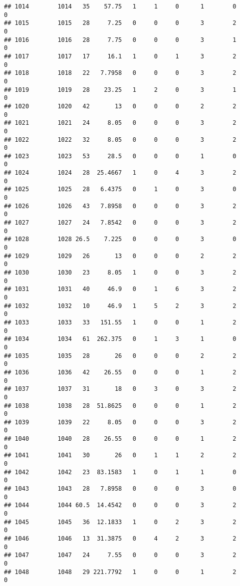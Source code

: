\documentclass[
]{article}
\begin{document}
\begin{verbatim}
## 1014        1014   35    57.75   1     1     0      1        0         0
## 1015        1015   28     7.25   0     0     0      3        2         0
## 1016        1016   28     7.75   0     0     0      3        1         0
## 1017        1017   17     16.1   1     0     1      3        2         0
## 1018        1018   22   7.7958   0     0     0      3        2         0
## 1019        1019   28    23.25   1     2     0      3        1         0
## 1020        1020   42       13   0     0     0      2        2         0
## 1021        1021   24     8.05   0     0     0      3        2         0
## 1022        1022   32     8.05   0     0     0      3        2         0
## 1023        1023   53     28.5   0     0     0      1        0         0
## 1024        1024   28  25.4667   1     0     4      3        2         0
## 1025        1025   28   6.4375   0     1     0      3        0         0
## 1026        1026   43   7.8958   0     0     0      3        2         0
## 1027        1027   24   7.8542   0     0     0      3        2         0
## 1028        1028 26.5    7.225   0     0     0      3        0         0
## 1029        1029   26       13   0     0     0      2        2         0
## 1030        1030   23     8.05   1     0     0      3        2         0
## 1031        1031   40     46.9   0     1     6      3        2         0
## 1032        1032   10     46.9   1     5     2      3        2         0
## 1033        1033   33   151.55   1     0     0      1        2         0
## 1034        1034   61  262.375   0     1     3      1        0         0
## 1035        1035   28       26   0     0     0      2        2         0
## 1036        1036   42    26.55   0     0     0      1        2         0
## 1037        1037   31       18   0     3     0      3        2         0
## 1038        1038   28  51.8625   0     0     0      1        2         0
## 1039        1039   22     8.05   0     0     0      3        2         0
## 1040        1040   28    26.55   0     0     0      1        2         0
## 1041        1041   30       26   0     1     1      2        2         0
## 1042        1042   23  83.1583   1     0     1      1        0         0
## 1043        1043   28   7.8958   0     0     0      3        0         0
## 1044        1044 60.5  14.4542   0     0     0      3        2         0
## 1045        1045   36  12.1833   1     0     2      3        2         0
## 1046        1046   13  31.3875   0     4     2      3        2         0
## 1047        1047   24     7.55   0     0     0      3        2         0
## 1048        1048   29 221.7792   1     0     0      1        2         0

\end{verbatim}
\end{document}
